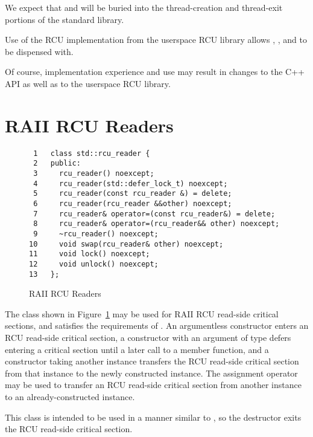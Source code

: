 \documentclass[letterpaper,10pt]{article}
\begin{document}
We expect that  and 
will be buried into the thread-creation and thread-exit portions of the
standard library.

Use of the  RCU implementation from the userspace
RCU library allows , ,
and  to be dispensed with.

Of course, implementation experience and use may result in changes
to the C++ API as well as to the userspace RCU library.

\section{RAII RCU Readers}
\label{sec:RAII RCU Readers}

\begin{figure}[tbp]
{ \scriptsize
\begin{verbatim}
 1   class std::rcu_reader {
 2   public:
 3     rcu_reader() noexcept;
 4     rcu_reader(std::defer_lock_t) noexcept;
 5     rcu_reader(const rcu_reader &) = delete;
 6     rcu_reader(rcu_reader &&other) noexcept;
 7     rcu_reader& operator=(const rcu_reader&) = delete;
 8     rcu_reader& operator=(rcu_reader&& other) noexcept;
 9     ~rcu_reader() noexcept;
10     void swap(rcu_reader& other) noexcept;
11     void lock() noexcept;
12     void unlock() noexcept;
13   };
\end{verbatim}
}
\caption{RAII RCU Readers}
\label{fig:RAII RCU Readers}
\end{figure}

The  class shown in
Figure~\ref{fig:RAII RCU Readers}
may be used for RAII RCU read-side critical sections, and
satisfies the requirements of .
An argumentless constructor enters an RCU read-side critical section,
a constructor with an argument of type  defers
entering a critical section until a later call to a
 member function,
and a constructor taking another  instance
transfers the RCU read-side critical section from that instance
to the newly constructed instance.
The assignment operator may be used to transfer an RCU read-side critical
section from another  instance to an already-constructed
instance.

This class is intended to be used in a manner similar to ,
so the destructor exits the RCU read-side critical section.
\end{document}

